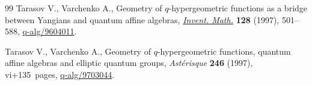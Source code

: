 \begin{thebibliography}{99}
Tarasov V., Varchenko A., Geometry of {$q$}-hypergeometric functions as a
 bridge between {Y}angians and quantum affine algebras, \href{https://doi.org/10.1007/s002220050151}{\textit{Invent. Math.}}
 \textbf{128} (1997), 501--588, \href{https://arxiv.org/abs/q-alg/9604011}{q-alg/9604011}.

Tarasov V., Varchenko A., Geometry of {$q$}-hypergeometric functions, quantum
 affine algebras and elliptic quantum groups, \textit{Ast\'{e}risque}
 \textbf{246} (1997), vi+135~pages, \href{https://arxiv.org/abs/q-alg/9703044}{q-alg/9703044}.

\end{thebibliography}
